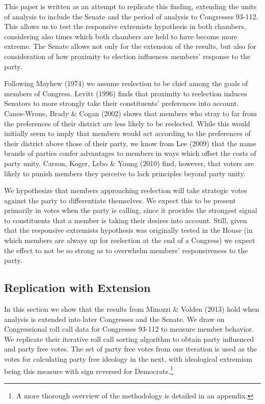 \documentclass[12pt]{article}
\begin{document}
This paper is written as an attempt to replicate this finding, extending the units of analysis to include the Senate and the period of analysis to Congresses 93-112. This allows us to test the responsive extremists hypothesis in both chambers, considering also times which both chambers are held to have become more extreme. The Senate allows not only for the extension of the results, but also for consideration of how proximity to election influences members' response to the party.

Following Mayhew (1974) we assume reelection to be chief among the goals of members of Congress. Levitt (1996) finds that proximity to reelection induces Senators to more strongly take their constituents' preferences into account. Canes-Wrone, Brady \& Cogan (2002) shows that members who stray to far from the preferences of their district are less likely to be reelected. While this would initially seem to imply that members would act according to the preferences of their district above those of their party, we know from Lee (2009) that the name brands of parties confer advantages to members in ways which offset the costs of party unity. Carson, Koger, Lebo \& Young (2010) find, however, that voters are likely to punish members they perceive to lack principles beyond party unity. 

We hypothesize that members approaching reelection will take strategic votes against the party to differentiate themselves. We expect this to be present primarily in votes when the party is calling, since it provides the strongest signal to constituents that a member is taking their desires into account. Still, given that the responsive extremists hypothesis was originally tested in the House (in which members are always up for reelection at the end of a Congress) we expect the effect to not be so strong as to overwhelm members' responsiveness to the party.

\subsection{Replication with Extension}

In this section we show that the results from Minozzi \& Volden (2013) hold when analysis is extended into later Congresses and the Senate. We draw on Congressional roll call data for Congresses 93-112 to measure member behavior. We replicate their iterative roll call sorting algorithm to obtain party influenced and party free votes. The set of party free votes from one iteration is used as the votes for calculating party free ideology in the next, with ideological extremism being this measure with sign reversed for Democrats.\footnote{A more thorough overview of the methodology is detailed in an appendix.}
\end{document}
